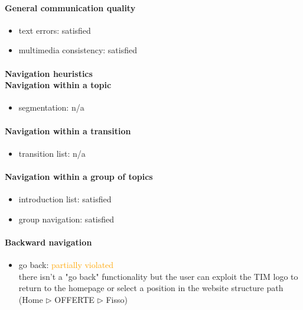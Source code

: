 \begin{enumerate}
	\paragraph*{General communication quality}
	\begin{itemize}
		\item text errors: satisfied
		\item multimedia consistency: satisfied
	\end{itemize}

	\paragraph*{Navigation heuristics \\ Navigation within a topic}
	\begin{itemize}
		\item segmentation: n/a
	\end{itemize}	
	
	\paragraph*{Navigation within a transition}
	\begin{itemize}
		\item transition list: n/a
	\end{itemize}
	
	\paragraph*{Navigation within a group of topics}
	\begin{itemize}
		\item introduction list: satisfied
		\item group navigation: satisfied
	\end{itemize}

	\paragraph*{Backward navigation}
	\begin{itemize}
		\item go back: \textcolor {orange}{partially violated}\\
		there isn't a "go back" functionality but the user can exploit the TIM logo to return to the homepage or select a position in the website structure path (Home $\triangleright$ OFFERTE $\triangleright$ Fisso)
	\end{itemize}
	

\end{enumerate}

